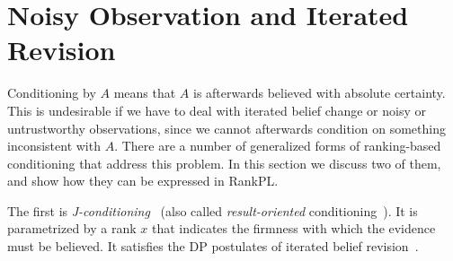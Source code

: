 \documentclass{llncs}
\begin{document}
\section{Noisy Observation and Iterated Revision}\label{sec:noisy}

Conditioning by $A$ means that $A$ is afterwards believed with absolute certainty.
This is undesirable if we have to deal with iterated belief change or noisy or untrustworthy observations,
	since we cannot afterwards condition on something inconsistent with $A$.
There are a number of generalized forms of ranking-based conditioning that address this problem.
In this section we discuss two of them, and show how they can be expressed in RankPL.

The first is \emph{J-conditioning}~\cite{goldszmidt1996qualitative} (also called \emph{result-oriented} conditioning~\cite{DBLP:books/daglib/0035277}).
It is parametrized by a rank $x$ that indicates the firmness with which the evidence must be believed.
It satisfies the DP postulates of iterated belief revision~\cite{DBLP:dblp_journals/ai/DarwicheP97}.
\end{document}

